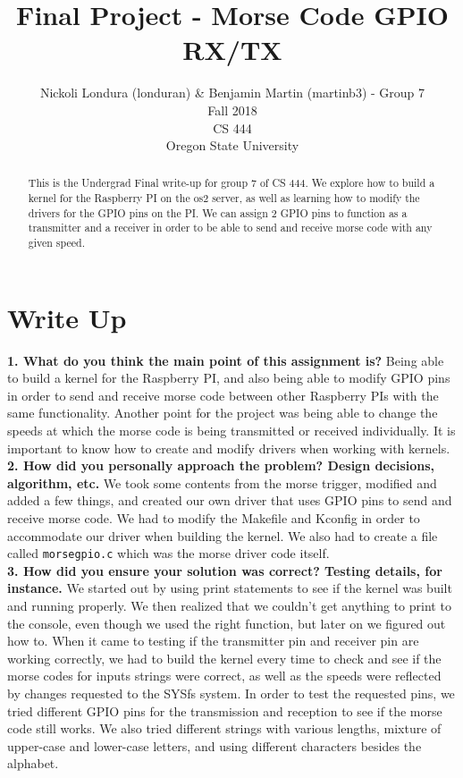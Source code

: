\documentclass[10pt,english]{article}
\title{Final Project - Morse Code GPIO RX/TX}
\author{Nickoli Londura (londuran) \& Benjamin Martin (martinb3) - Group 7 \\ Fall 2018 \\ CS 444 \\ Oregon State University}
\begin{document}
\maketitle

\begin{abstract}

\noindent This is the Undergrad Final write-up for group 7 of CS 444. We explore how to build a kernel for the Raspberry PI on the os2 server, as well as learning how to modify the drivers for the GPIO pins on the PI. We can assign 2 GPIO pins to function as a transmitter and a receiver in order to be able to send and receive morse code with any given speed.

\end{abstract}

\newpage

\section{Write Up}

\textbf{1. What do you think the main point of this assignment is?}
Being able to build a kernel for the Raspberry PI, and also being able to modify GPIO pins in order to send and receive morse code between other Raspberry PIs with the same functionality. Another point for the project was being able to change the speeds at which the morse code is being transmitted or received individually. It is important to know how to create and modify drivers when working with kernels. \\

\noindent \textbf{2. How did you personally approach the problem? Design decisions, algorithm, etc.}
We took some contents from the morse trigger, modified and added a few things, and created our own driver that uses GPIO pins to send and receive morse code. We had to modify the Makefile and Kconfig in order to accommodate our driver when building the kernel. We also had to create a file called \verb|morsegpio.c| which was the morse driver code itself. \\


\noindent \textbf{3. How did you ensure your solution was correct? Testing details, for instance.}
We started out by using print statements to see if the kernel was built and running properly. We then realized that we couldn't get anything to print to the console, even though we used the right function, but later on we figured out how to. When it came to testing if the transmitter pin and receiver pin are working correctly, we had to build the kernel every time to check and see if the morse codes for inputs strings were correct, as well as the speeds were reflected by changes requested to the SYSfs system. In order to test the requested pins, we tried different GPIO pins for the transmission and reception to see if the morse code still works. We also tried different strings with various lengths, mixture of upper-case and lower-case letters, and using different characters besides the alphabet. \\
\end{document}
